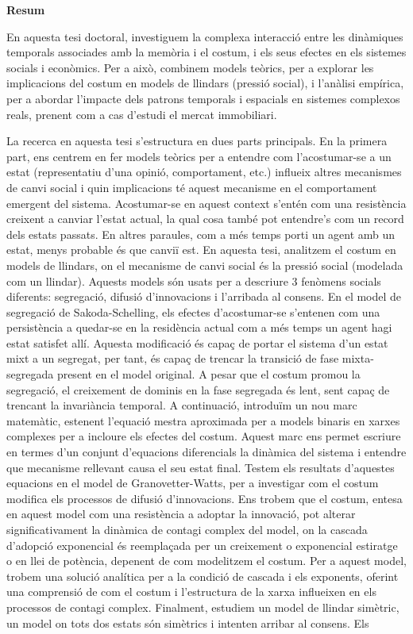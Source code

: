 \pagebreak
\thispagestyle{empty}
{}
\textbf{\huge Resum}

\vspace*{0.5 cm}

En aquesta tesi doctoral, investiguem la complexa interacció entre les dinàmiques temporals associades amb la memòria i el costum, i els seus efectes en els sistemes socials i econòmics. Per a això, combinem models teòrics, per a explorar les implicacions del costum en models de llindars (pressió social), i l'anàlisi empírica, per a abordar l'impacte dels patrons temporals i espacials en sistemes complexos reals, prenent com a cas d'estudi el mercat immobiliari.

La recerca en aquesta tesi s'estructura en dues parts principals. En la primera part, ens centrem en fer models teòrics per a entendre com l'acostumar-se a un estat (representatiu d'una opinió, comportament, etc.) influeix altres mecanismes de canvi social i quin implicacions té aquest mecanisme en el comportament emergent del sistema. Acostumar-se en aquest context s'entén com una resistència creixent a canviar l'estat actual, la qual cosa també pot entendre's com un record dels estats passats. En altres paraules, com a més temps porti un agent amb un estat, menys probable és que canviï est. En aquesta tesi, analitzem el costum en models de llindars, on el mecanisme de canvi social és la pressió social (modelada com un llindar). Aquests models són usats per a descriure 3 fenòmens socials diferents: segregació, difusió d'innovacions i l'arribada al consens. En el model de segregació de Sakoda-Schelling, els efectes d'acostumar-se s'entenen com una persistència a quedar-se en la residència actual com a més temps un agent hagi estat satisfet allí. Aquesta modificació és capaç de portar el sistema d'un estat mixt a un segregat, per tant, és capaç de trencar la transició de fase mixta-segregada present en el model original. A pesar que el costum promou la segregació, el creixement de dominis en la fase segregada és lent, sent capaç de trencant la invariància temporal. A continuació, introduïm un nou marc matemàtic, estenent l'equació mestra aproximada per a models binaris en xarxes complexes per a incloure els efectes del costum. Aquest marc ens permet escriure en termes d'un conjunt d'equacions diferencials la dinàmica del sistema i entendre que mecanisme rellevant causa el seu estat final. Testem els resultats d'aquestes equacions en el model de Granovetter-Watts, per a investigar com el costum modifica els processos de difusió d'innovacions. Ens trobem que el costum, entesa en aquest model com una resistència a adoptar la innovació, pot alterar significativament la dinàmica de contagi complex del model, on la cascada d'adopció exponencial és reemplaçada per un creixement o exponencial estiratge o en llei de potència, depenent de com modelitzem el costum. Per a aquest model, trobem una solució analítica per a la condició de cascada i els exponents, oferint una comprensió de com el costum i l'estructura de la xarxa influeixen en els processos de contagi complex. Finalment, estudiem un model de llindar simètric, un model on tots dos estats són simètrics i intenten arribar al consens. Els 